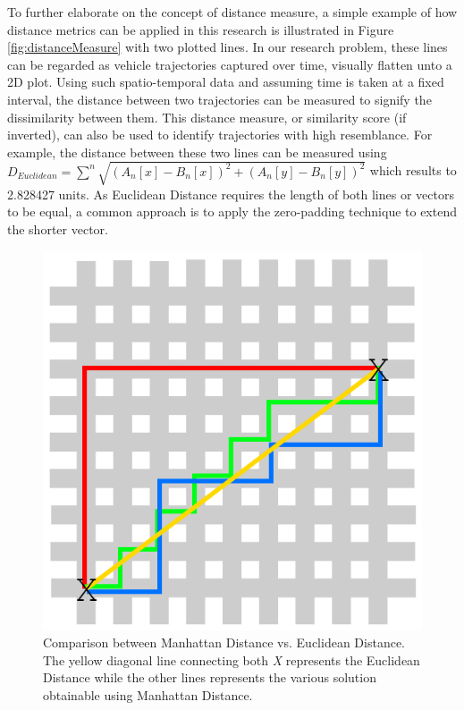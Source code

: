To further elaborate on the concept of distance measure, a simple
example of how distance metrics can be applied in this research is
illustrated in Figure \ref{fig:distanceMeasure} with two plotted lines.
In our research problem, these lines can be regarded as vehicle
trajectories captured over time, visually flatten unto a 2D plot. Using such spatio-temporal data and assuming time is taken at a fixed interval, the distance between two trajectories can be measured to signify
the dissimilarity between them. This distance measure, or similarity score (if inverted), can also be used to
identify trajectories with high resemblance. For example, the distance between these two lines can be measured using $D_{Euclidean} = \sum^n\sqrt{{(A_n[x] - B_n[x])}^{2} + {(A_n[y] - B_n[y])}^{2}}$ which results to 2.828427 units. As Euclidean Distance requires the length of both lines or vectors to be equal, a common approach is to apply the zero-padding technique to extend the shorter vector.

\begin{figure}[hbt!]
 \centering
 \includegraphics[width=.5\textwidth]{image/lit/manhattan.png}
 \caption[Comparison between Manhattan Distance vs. Euclidean Distance]{Comparison between Manhattan Distance vs. Euclidean Distance. The yellow diagonal line connecting both \emph{X} represents the Euclidean Distance while the other lines represents the various solution obtainable using Manhattan Distance.}
 \label{fig:manhattan}
\end{figure}

